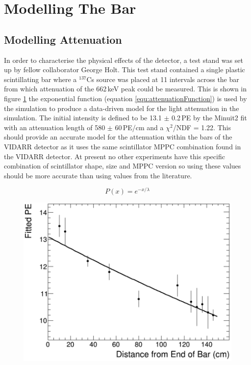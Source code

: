 \section{Modelling The Bar}
\subsection{Modelling Attenuation}\label{sec:GEANT4Simulation_ModellingAttenuation}
In order to characterise the physical effects of the detector, a test stand was set up by fellow collaborator George Holt. This test stand contained a single plastic scintillating bar where a $^{137}$Cs source was placed at 11 intervals across the bar from which attenuation of the 662\,keV peak could be measured. This is shown in figure \ref{fig:attenuationPlot} the exponential function (equation \ref{equ:attenuationFunction}) is used by the simulation to produce a data-driven model for the light attenuation in the simulation. The initial intensity is defined to be 13.1 $\pm$ 0.2\,PE by the Minuit2 fit with an attenuation length of 580 $\pm$ 60\,PE/cm and a $\chi^2$/NDF = 1.22. This should provide an accurate model for the attenuation within the bars of the VIDARR detector as it uses the same scintillator MPPC combination found in the VIDARR detector. At present no other experiments have this specific combination of scintillator shape, size and MPPC version so using these values should be more accurate than using values from the literature. 

\begin{equation}
P(x) = e^{-x/\lambda}
\label{equ:attenuationFunction}
\end{equation}

\begin{figure}[!h]
 \centering
 \includegraphics[width=0.7\linewidth]{Chapter4/attenuation_plot_no_box.png} 
 \label{fig:attenuationPlot}
\end{figure}

